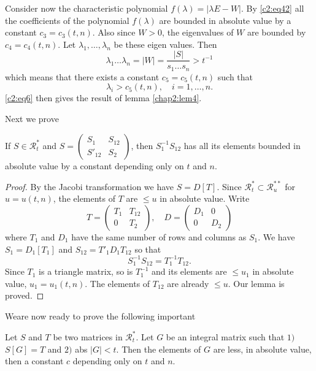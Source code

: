 Consider now the characteristic polynomial $f(\lambda)=|\lambda
E-W|$. By \eqref{c2:eq42} all the coefficients of the polynomial
$f(\lambda)$ are bounded in absolute value by a constant
$c_{3}=c_{3}(t,n)$. Also since $W>0$, the eigen\pageoriginale values
of $W$ are bounded by $c_{4}=c_{4}(t,n)$. Let
$\lambda_{1},\ldots,\lambda_{n}$ be these eigen values. Then
$$
\lambda_{1}\ldots\lambda_{n}=|W|=\frac{|S|}{s_{1}\ldots s_{n}}>t^{-1}
$$
which means that there exists a constant $c_{5}=c_{5}(t,n)$ such that
$$
\lambda_{i}>c_{5}(t,n),\quad i=1,\ldots,n.
$$
\eqref{c2:eq6} then gives the result of lemma \ref{chap2:lem4}.

Next we prove
\begin{lem}\label{chap2:lem5}
If $S\in \mathscr{R}^{\ast}_{t}$ and $S=\left(\begin{smallmatrix}S_{1}
  & S_{12}\\ S'_{12} & S_{2}\end{smallmatrix}\right)$, then
$S^{-1}_{1}S_{12}$ has all its elements bounded in absolute value by a
constant depending only on $t$ and $n$.
\end{lem}

\begin{proof}
By the Jacobi transformation we have $S=D[T]$. Since
$\mathscr{R}^{\ast}_{t}\subset \mathscr{R}^{\ast\ast}_{u}$ for
$u=u(t,n)$, the elements of $T$ are $\leq u$ in absolute value. Write
$$
T=
\begin{pmatrix}
T_{1} & T_{12}\\
0 & T_{2}
\end{pmatrix},\quad
D=
\begin{pmatrix}
D_{1} & 0\\
0 & D_{2}
\end{pmatrix}
$$
where $T_{1}$ and $D_{1}$ have the same number of rows and columns as
$S_{1}$. We have $S_{1}=D_{1}[T_{1}]$ and $S_{12}=T'_{1}D_{1}T_{12}$
so that
$$
S^{-1}_{1}S_{12}=T^{-1}_{1}T_{12}.
$$
Since $T_{1}$ is a triangle matrix, so is $T^{-1}_{1}$ and its
elements are $\leq u_{1}$ in absolute value, $u_{1}=u_{1}(t,n)$. The
elements of $T_{12}$ are already $\leq u$. Our lemma is proved.
\end{proof}

We\pageoriginale are now ready to prove the following important

\begin{thm}\label{chap2:thm5}
Let $S$ and $T$ be two matrices in $\mathscr{R}^{\ast}_{t}$. Let $G$
be an integral matrix such that $1)$ $S[G]=T$ and $2)$ abs
$|G|<t$. Then the elements of $G$ are less, in absolute value, then a
constant $c$ depending only on $t$ and $n$.
\end{thm}

